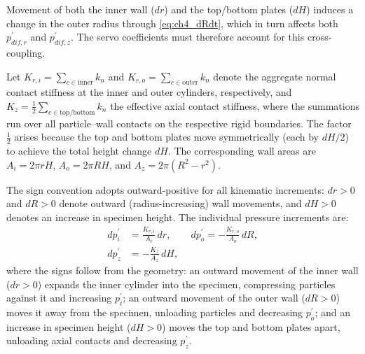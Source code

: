 \documentclass[../main]{subfiles}
\begin{document}
Movement of both the inner wall ($dr$) and the top/bottom plates ($dH$) induces a change in the outer radius through \cref{eq:ch4_dRdt}, which in turn affects both $p_{dif,r}^{\prime}$ and $p_{dif,z}^{\prime}$. The servo coefficients must therefore account for this cross-coupling.

Let $K_{r,i}=\sum_{c\in\mathrm{inner}} k_n$ and $K_{r,o}=\sum_{c\in\mathrm{outer}} k_n$ denote the aggregate normal contact stiffness at the inner and outer cylinders, respectively, and $K_z=\frac{1}{2}\sum_{c\in\mathrm{top/bottom}} k_n$ the effective axial contact stiffness, where the summations run over all particle--wall contacts on the respective rigid boundaries. The factor $\frac{1}{2}$ arises because the top and bottom plates move symmetrically (each by $dH/2$) to achieve the total height change $dH$. The corresponding wall areas are $A_i=2\pi rH$, $A_o=2\pi RH$, and $A_z=2\pi(R^2-r^2)$.

The sign convention adopts outward-positive for all kinematic increments: $dr>0$ and $dR>0$ denote outward (radius-increasing) wall movements, and $dH>0$ denotes an increase in specimen height. The individual pressure increments are:
\begin{align}
dp_i^{\prime} &= \frac{K_{r,i}}{A_i}\,dr,\qquad
dp_o^{\prime} = -\frac{K_{r,o}}{A_o}\,dR, \label{eq:ch4_dp_r}\\[4pt]
dp_z^{\prime} &= -\frac{K_z}{A_z}\,dH, \label{eq:ch4_dp_z}
\end{align}
where the signs follow from the geometry: an outward movement of the inner wall ($dr>0$) expands the inner cylinder into the specimen, compressing particles against it and increasing $p_i^{\prime}$; an outward movement of the outer wall ($dR>0$) moves it away from the specimen, unloading particles and decreasing $p_o^{\prime}$; and an increase in specimen height ($dH>0$) moves the top and bottom plates apart, unloading axial contacts and decreasing $p_z^{\prime}$.
\end{document}
